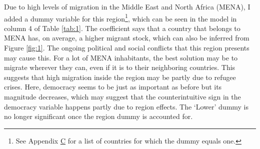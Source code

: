 \documentclass[../main.tex]{subfiles}
\begin{document}
Due to high levels of migration in the Middle East and North Africa (MENA), I added a dummy variable for this region\footnote{See Appendix \hyperref[sec:C]{C} for a list of countries for which the dummy equals one.}, which can be seen in the model in column 4 of Table \ref{tab:1}.  The coefficient says that a country that belongs to MENA has, on average, a higher migrant stock, which can also be inferred from Figure \ref{fig:1}. The ongoing political and social conflicts that this region presents may cause this. For a lot of MENA inhabitants, the best solution may be to migrate wherever they can, even if it is to their neighboring countries. This suggests that high migration inside the region may be partly due to refugee crises. Here, democracy seems to be just as important as before but its magnitude decreases, which may suggest that the counterintuitive sign in the democracy variable happens partly due to region effects. The ‘Lower’ dummy is no longer significant once the region dummy is accounted for. 
\begin{figure}[H]
\centering
{}
\end{figure}
\end{document}
